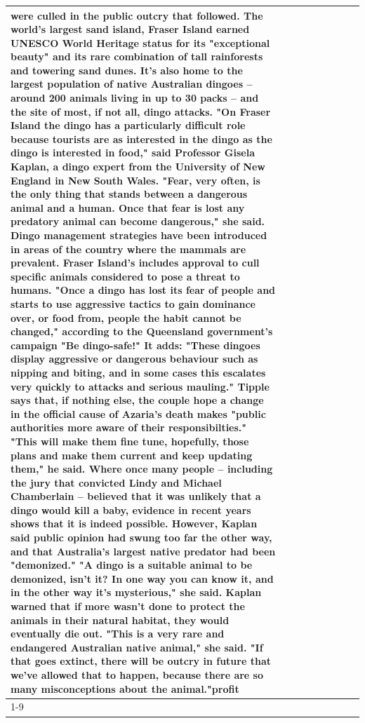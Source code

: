 \begin{table}[H]
\begin{tabular}{lllrlllll}
were culled in the public outcry that followed. The world's largest sand island, Fraser Island earned UNESCO World Heritage status for its "exceptional beauty" and its rare combination of tall rainforests and towering sand dunes. It's also home to the largest population of native Australian dingoes -- around 200 animals living in up to 30 packs -- and the site of most, if not all, dingo attacks. "On Fraser Island the dingo has a particularly difficult role because tourists are as interested in the dingo as the dingo is interested in food," said Professor Gisela Kaplan, a dingo expert from the University of New England in New South Wales. "Fear, very often, is the only thing that stands between a dangerous animal and a human. Once that fear is lost any predatory animal can become dangerous," she said. Dingo management strategies have been introduced in areas of the country where the mammals are prevalent. Fraser Island's includes approval to cull specific animals considered to pose a threat to humans. "Once a dingo has lost its fear of people and starts to use aggressive tactics to gain dominance over, or food from, people the habit cannot be changed," according to the Queensland government's campaign "Be dingo-safe!" It adds: "These dingoes display aggressive or dangerous behaviour such as nipping and biting, and in some cases this escalates very quickly to attacks and serious mauling." Tipple says that, if nothing else, the couple hope a change in the official cause of Azaria's death makes "public authorities more aware of their responsibilties." "This will make them fine tune, hopefully, those plans and make them current and keep updating them," he said. Where once many people -- including the jury that convicted Lindy and Michael Chamberlain -- believed that it was unlikely that a dingo would kill a baby, evidence in recent years shows that it is indeed possible. However, Kaplan said public opinion had swung too far the other way, and that Australia's largest native predator had been "demonized." "A dingo is a suitable animal to be demonized, isn't it? In one way you can know it, and in the other way it's mysterious," she said. Kaplan warned that if more wasn't done to protect the animals in their natural habitat, they would eventually die out. "This is a very rare and endangered Australian native animal," she said. "If that goes extinct, there will be outcry in future that we've allowed that to happen, because there are so many misconceptions about the animal."profit \\
\cline{1-9}

\end{tabular}
\end{table}
